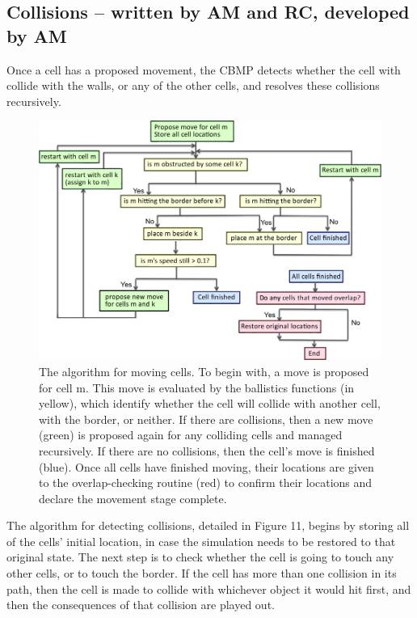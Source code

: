 \documentclass[12pt]{article}
\begin{document}
\subsection{Collisions -- written by AM and RC, developed by AM}
  Once a cell has a proposed movement, the CBMP 
detects whether the cell with collide with the walls, or any of the 
other cells, and resolves these collisions recursively.

\begin{figure}[H]
\centering
\includegraphics[width=\textwidth]{media/algorithm.png}
\caption{The algorithm for moving cells. To begin with, a move is proposed
for cell m. This move is evaluated by the ballistics functions (in yellow),
which identify whether the cell will collide with another cell, with 
the border, or neither. If there are collisions, then a new move (green) is 
proposed again for any colliding cells and managed recursively. If there
are no collisions, then the cell's move is finished (blue). Once all cells
have finished moving, their locations are given to the overlap-checking routine 
(red) to confirm their locations and declare the movement stage complete.}
\end{figure}

The algorithm for detecting collisions, detailed in Figure 11, begins by storing all of the 
cells' initial location, in case the simulation needs to be restored to 
that original state. The next step is to check 
whether the cell is going to touch any other cells, or to touch the 
border. If the cell has more than one collision in its path, then the 
cell is made to collide with whichever object it would hit first, and 
then the consequences of that collision are played out. 
\end{document}
